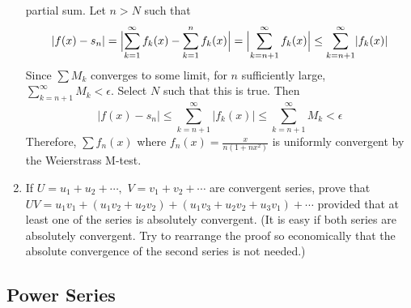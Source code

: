 \begin{enumerate}
  partial sum.
  Let \(n > N\) such that
  \[
  \lvert f(x) - s_n\rvert = \Bigl\lvert\sum_{k = 1}^{\infty}f_k(x) -
  \sum_{k = 1}^nf_k(x)\Bigr\rvert =
  \Bigl\lvert\sum_{k = n + 1}^{\infty}f_k(x)\Bigr\rvert\leq
  \sum_{k = n + 1}^{\infty}\lvert f_k(x)\rvert
  \]
  Since \(\sum M_k\) converges to some limit, for \(n\) sufficiently large,
  \(\sum_{k = n + 1}^{\infty}M_k < \epsilon\).
  Select \(N\) such that this is true.
  Then
  \[
  \lvert f(x) - s_n\rvert\leq\sum_{k = n + 1}^{\infty}\lvert f_k(x)\rvert\leq
  \sum_{k = n + 1}^{\infty}M_k < \epsilon
  \]
  Therefore, \(\sum f_n(x)\) where \(f_n(x) = \frac{x}{n(1 + nx^2)}\) is
  uniformly convergent by the Weierstrass M-test.
\item
  If \(U = u_1 + u_2 + \cdots,\) \(V = v_1 + v_2 + \cdots\) are convergent
  series, prove that
  \(UV = u_1v_1 + (u_1v_2 + u_2v_2) + (u_1v_3 + u_2v_2 + u_3v_1) + \cdots\)
  provided that at least one of the series is absolutely convergent.
  (It is easy if both series are absolutely convergent.
  Try to rearrange the proof so economically that the absolute convergence of
  the second series is not needed.)
\end{enumerate}

\subsection{Power Series}


